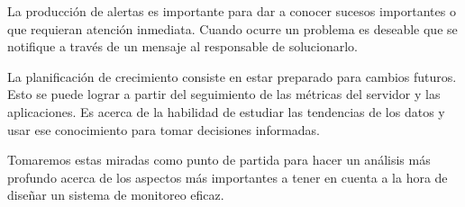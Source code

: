 La producción de alertas es importante para dar a conocer sucesos importantes o que requieran atención inmediata. Cuando ocurre un problema es deseable que se notifique a través de un mensaje al responsable de solucionarlo.

La planificación de crecimiento consiste en estar preparado para cambios futuros. Esto se puede lograr a partir del seguimiento de las métricas del servidor y las aplicaciones. Es acerca de la habilidad de estudiar las tendencias de los datos y usar ese conocimiento para tomar decisiones informadas.

Tomaremos estas miradas como punto de partida para hacer un análisis más profundo acerca de los aspectos más importantes a tener en cuenta a la hora de diseñar un sistema de monitoreo eficaz.
